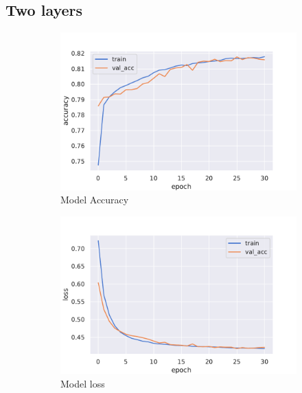 \subsection{Two layers }
\begin{figure}[H]
     \centering
     \begin{subfigure}[b]{0.3\textwidth}
         \centering
         \includegraphics[width=\textwidth]{figure_3/One_node_two_accuracy.pdf}
         \caption{Model Accuracy}
         \label{fig:y equals x}
     \end{subfigure}
     \hfill
     \begin{subfigure}[b]{0.3\textwidth}
         \centering
         \includegraphics[width=\textwidth]{figure_3/One_node_two_loss.pdf}
         \caption{Model loss}
         \label{fig:three sin x}
     \end{subfigure}
     \hfill
     \begin{subfigure}[b]{0.3\textwidth}

\end{subfigure}
\end{figure}
